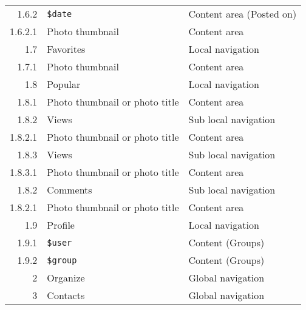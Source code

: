 \documentclass[11pt,a4paper]{article}
\newcommand{\var}[1]{\texttt{\${#1}}}
\begin{document}
\begin{center}
\begin{small}
\begin{longtable}{rll}
          1.6.2 &
          \var{date} &
          Content area (Posted on) \\

            1.6.2.1 &
            Photo thumbnail &
            Content area \\

        1.7 &
        Favorites &
        Local navigation \\

          1.7.1 &
          Photo thumbnail &
          Content area \\

        1.8 &
        Popular &
        Local navigation \\

          1.8.1 &
          Photo thumbnail or photo title &
          Content area \\

          1.8.2 &
          Views &
          Sub local navigation \\

            1.8.2.1 &
            Photo thumbnail or photo title &
            Content area \\

          1.8.3 &
          Views &
          Sub local navigation \\

            1.8.3.1 &
            Photo thumbnail or photo title &
            Content area \\

          1.8.2 &
          Comments &
          Sub local navigation \\

            1.8.2.1 &
            Photo thumbnail or photo title &
            Content area \\

        1.9 &
        Profile &
        Local navigation \\

          1.9.1 &
          \var{user} &
          Content (Groups) \\

          1.9.2 &
          \var{group} &
          Content (Groups) \\

      2 &
      Organize &
      Global navigation \\

      3 &
      Contacts &
      Global navigation \\


\end{longtable}
\end{small}
\end{center}
\end{document}
